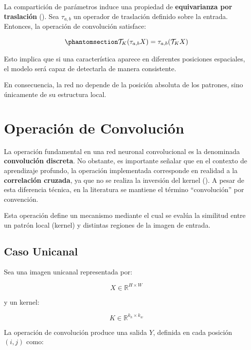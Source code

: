 \documentclass[
  spanish,
  us-letterpaper,
]{scrreprt}
\theoremstyle{definition}
\theoremstyle{remark}
\begin{document}
La compartición de parámetros induce una propiedad de
\textbf{equivarianza por traslación}
().
Sea \(\tau_{a,b}\) un operador de traslación definido sobre la entrada.
Entonces, la operación de convolución satisface:

\begin{equation}\phantomsection\label{eq-equivarianza}{
\mathcal{T}_K(\tau_{a,b} X) = \tau_{a,b} (\mathcal{T}_K X)
}\end{equation}

Esto implica que si una característica aparece en diferentes posiciones
espaciales, el modelo será capaz de detectarla de manera consistente.

En consecuencia, la red no depende de la posición absoluta de los
patrones, sino únicamente de su estructura local.

\section{Operación de Convolución}\label{operaciuxf3n-de-convoluciuxf3n}

La operación fundamental en una red neuronal convolucional es la
denominada \textbf{convolución discreta}. No obstante, es importante
señalar que en el contexto de aprendizaje profundo, la operación
implementada corresponde en realidad a la \textbf{correlación cruzada},
ya que no se realiza la inversión del kernel
(). A
pesar de esta diferencia técnica, en la literatura se mantiene el
término ``convolución'' por convención.

Esta operación define un mecanismo mediante el cual se evalúa la
similitud entre un patrón local (kernel) y distintas regiones de la
imagen de entrada.

\subsection{Caso Unicanal}\label{caso-unicanal}

Sea una imagen unicanal representada por:

\[
X \in \mathbb{R}^{H \times W}
\]

y un kernel:

\[
K \in \mathbb{R}^{k_h \times k_w}
\]

La operación de convolución produce una salida \(Y\), definida en cada
posición \((i,j)\) como:
\end{document}
